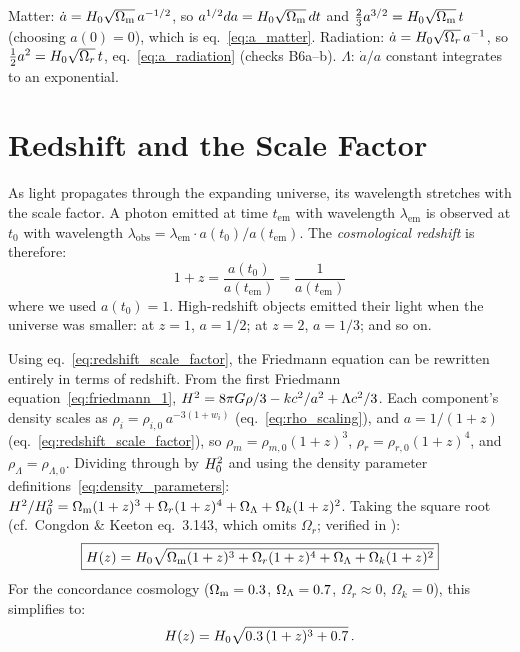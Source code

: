 \begin{derivation}
Matter: $\dot a = H_0\sqrt{\Omega_{\mathrm{m}}}\,a^{-1/2}$, so
$a^{1/2}da = H_0\sqrt{\Omega_{\mathrm{m}}}\,dt$ and $\tfrac23 a^{3/2} = H_0\sqrt{\Omega_{\mathrm{m}}}\,t$
(choosing $a(0) = 0$), which is eq.~\eqref{eq:a_matter}.  Radiation:
$\dot a = H_0\sqrt{\Omega_r}\,a^{-1}$, so $\tfrac12 a^2 = H_0\sqrt{\Omega_r}\,t$,
eq.~\eqref{eq:a_radiation} (checks B6a--b).  $\Lambda$: $\dot a/a$ constant
integrates to an exponential.
\end{derivation}

\section{Redshift and the Scale Factor}
\label{sec:redshift}

As light propagates through the expanding universe, its wavelength
stretches with the scale factor.  A photon emitted at time $t_{\mathrm{em}}$
with wavelength $\lambda_{\mathrm{em}}$ is observed at $t_0$ with
wavelength $\lambda_{\mathrm{obs}} = \lambda_{\mathrm{em}} \cdot
a(t_0) / a(t_{\mathrm{em}})$.  The \emph{cosmological redshift} is
therefore:
\begin{equation}
    \boxed{
    1 + z = \frac{a(t_0)}{a(t_{\mathrm{em}})} = \frac{1}{a(t_{\mathrm{em}})}
    }
    \label{eq:redshift_scale_factor}
\end{equation}
where we used $a(t_0) = 1$.  High-redshift objects emitted their light
when the universe was smaller: at $z = 1$, $a = 1/2$; at $z = 2$,
$a = 1/3$; and so on.

Using eq.~\eqref{eq:redshift_scale_factor}, the Friedmann equation can
be rewritten entirely in terms of redshift.  From the first Friedmann
equation~\eqref{eq:friedmann_1}, $H^2 = 8\pi G\rho/3
- kc^2/a^2 + \Lambda c^2/3$.  Each component's
density scales as $\rho_i = \rho_{i,0}\,a^{-3(1+w_i)}$
(eq.~\ref{eq:rho_scaling}), and $a = 1/(1+z)$ (eq.~\ref{eq:redshift_scale_factor}),
so $\rho_m = \rho_{m,0}(1+z)^3$, $\rho_r = \rho_{r,0}(1+z)^4$, and
$\rho_\Lambda = \rho_{\Lambda,0}$.  Dividing through by $H_0^2$ and
using the density parameter definitions~\eqref{eq:density_parameters}:
$H^2/H_0^2 = \Omega_{\mathrm{m}}(1+z)^3 + \Omega_r(1+z)^4 + \Omega_{\Lambda} +
\Omega_k(1+z)^2$.  Taking the square root
(cf.\ Congdon \& Keeton eq.~3.143, which omits $\Omega_r$; verified in
):
\begin{equation}
    \boxed{
    H(z) = H_0\sqrt{\Omega_{\mathrm{m}}(1+z)^3
    + \Omega_r(1+z)^4 + \Omega_{\Lambda} + \Omega_k(1+z)^2}
    }
    \label{eq:Hz}
\end{equation}
For the concordance cosmology ($\Omega_{\mathrm{m}} = 0.3$, $\Omega_{\Lambda} = 0.7$,
$\Omega_r \approx 0$, $\Omega_k = 0$), this simplifies to:
\begin{equation}
    H(z) = H_0\sqrt{0.3\,(1+z)^3 + 0.7} \,.
    \label{eq:Hz_concordance}
\end{equation}


